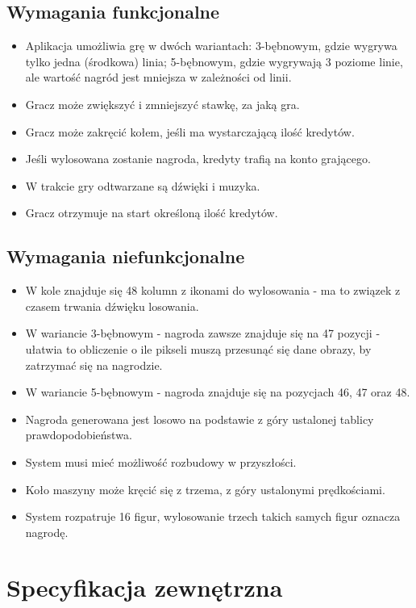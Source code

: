 \documentclass[a4paper,11pt,titlepage]{article}
\begin{document}
\subsection{Wymagania funkcjonalne}
\begin{itemize}
	\item Aplikacja umożliwia grę w dwóch wariantach: 3-bębnowym, gdzie wygrywa tylko jedna (środkowa) linia; 5-bębnowym, gdzie wygrywają 3 poziome linie, ale wartość nagród jest mniejsza w zależności od linii.
	\item Gracz może zwiększyć i zmniejszyć stawkę, za jaką gra.
	\item Gracz może zakręcić kołem, jeśli ma wystarczającą ilość kredytów.
	\item Jeśli wylosowana zostanie nagroda, kredyty trafią na konto grającego.
	\item W trakcie gry odtwarzane są dźwięki i muzyka.
	\item Gracz otrzymuje na start określoną ilość kredytów.
\end{itemize}

\subsection{Wymagania niefunkcjonalne}
\begin{itemize}
	\item W kole znajduje się 48 kolumn z ikonami do wylosowania - ma to związek z czasem trwania dźwięku losowania.
	\item W wariancie 3-bębnowym - nagroda zawsze znajduje się na 47 pozycji - ułatwia to obliczenie o ile pikseli muszą przesunąć się dane obrazy, by zatrzymać się na nagrodzie.
	\item W wariancie 5-bębnowym - nagroda znajduje się na pozycjach 46, 47 oraz 48.
	\item Nagroda generowana jest losowo na podstawie z góry ustalonej tablicy prawdopodobieństwa.
	\item System musi mieć możliwość rozbudowy w przyszłości.
	\item Koło maszyny może kręcić się z trzema, z góry ustalonymi prędkościami.
	\item System rozpatruje 16 figur, wylosowanie trzech takich samych figur oznacza nagrodę.
\end{itemize}

\section{Specyfikacja zewnętrzna}
\end{document}
